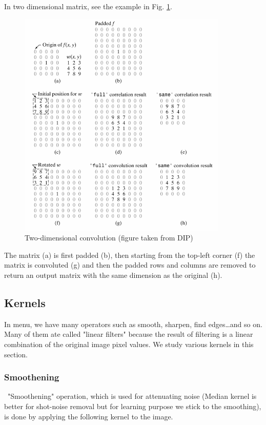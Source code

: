 In two dimensional matrix, see the example in Fig. \ref{fig:img52}. 

\begin{figure}[htbp]
\begin{center}
\includegraphics[width=10cm]{fig/CMCIBasicCourse201102-img52.png}
\caption{ Two-dimensional convolution (figure taken from DIP)}
\label{fig:img52}
\end{center}
\end{figure}

The matrix (a) is first padded (b), then starting from the top-left
corner (f) the matrix is convoluted (g) and then the padded rows and
columns are removed to return an output matrix with the same dimension
as the original (h).

\subsection{Kernels}

In \ijmenu{[Process]} menu, we have many operators such
as smooth, sharpen, find edges\dots and so on. Many of them ate
called "linear filters" because
the result of filtering is a linear combination of the original image
pixel values. We study various kernels in this section. 

\subsubsection{Smoothening}
\ "Smoothening" operation, which is
used for attenuating noise (Median kernel is better for shot-noise
removal but for learning purpose we stick to the smoothing), is done by
applying the following kernel to the image. 

